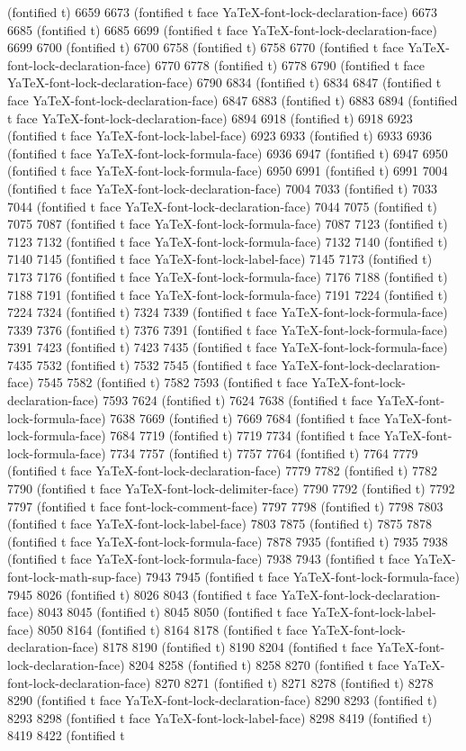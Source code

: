 (fontified t) 6659 6673 (fontified t face YaTeX-font-lock-declaration-face) 6673 6685 (fontified t) 6685 6699 (fontified t face YaTeX-font-lock-declaration-face) 6699 6700 (fontified t) 6700 6758 (fontified t) 6758 6770 (fontified t face YaTeX-font-lock-declaration-face) 6770 6778 (fontified t) 6778 6790 (fontified t face YaTeX-font-lock-declaration-face) 6790 6834 (fontified t) 6834 6847 (fontified t face YaTeX-font-lock-declaration-face) 6847 6883 (fontified t) 6883 6894 (fontified t face YaTeX-font-lock-declaration-face) 6894 6918 (fontified t) 6918 6923 (fontified t face YaTeX-font-lock-label-face) 6923 6933 (fontified t) 6933 6936 (fontified t face YaTeX-font-lock-formula-face) 6936 6947 (fontified t) 6947 6950 (fontified t face YaTeX-font-lock-formula-face) 6950 6991 (fontified t) 6991 7004 (fontified t face YaTeX-font-lock-declaration-face) 7004 7033 (fontified t) 7033 7044 (fontified t face YaTeX-font-lock-declaration-face) 7044 7075 (fontified t) 7075 7087 (fontified t face YaTeX-font-lock-formula-face) 7087 7123 (fontified t) 7123 7132 (fontified t face YaTeX-font-lock-formula-face) 7132 7140 (fontified t) 7140 7145 (fontified t face YaTeX-font-lock-label-face) 7145 7173 (fontified t) 7173 7176 (fontified t face YaTeX-font-lock-formula-face) 7176 7188 (fontified t) 7188 7191 (fontified t face YaTeX-font-lock-formula-face) 7191 7224 (fontified t) 7224 7324 (fontified t) 7324 7339 (fontified t face YaTeX-font-lock-formula-face) 7339 7376 (fontified t) 7376 7391 (fontified t face YaTeX-font-lock-formula-face) 7391 7423 (fontified t) 7423 7435 (fontified t face YaTeX-font-lock-formula-face) 7435 7532 (fontified t) 7532 7545 (fontified t face YaTeX-font-lock-declaration-face) 7545 7582 (fontified t) 7582 7593 (fontified t face YaTeX-font-lock-declaration-face) 7593 7624 (fontified t) 7624 7638 (fontified t face YaTeX-font-lock-formula-face) 7638 7669 (fontified t) 7669 7684 (fontified t face YaTeX-font-lock-formula-face) 7684 7719 (fontified t) 7719 7734 (fontified t face YaTeX-font-lock-formula-face) 7734 7757 (fontified t) 7757 7764 (fontified t) 7764 7779 (fontified t face YaTeX-font-lock-declaration-face) 7779 7782 (fontified t) 7782 7790 (fontified t face YaTeX-font-lock-delimiter-face) 7790 7792 (fontified t) 7792 7797 (fontified t face font-lock-comment-face) 7797 7798 (fontified t) 7798 7803 (fontified t face YaTeX-font-lock-label-face) 7803 7875 (fontified t) 7875 7878 (fontified t face YaTeX-font-lock-formula-face) 7878 7935 (fontified t) 7935 7938 (fontified t face YaTeX-font-lock-formula-face) 7938 7943 (fontified t face YaTeX-font-lock-math-sup-face) 7943 7945 (fontified t face YaTeX-font-lock-formula-face) 7945 8026 (fontified t) 8026 8043 (fontified t face YaTeX-font-lock-declaration-face) 8043 8045 (fontified t) 8045 8050 (fontified t face YaTeX-font-lock-label-face) 8050 8164 (fontified t) 8164 8178 (fontified t face YaTeX-font-lock-declaration-face) 8178 8190 (fontified t) 8190 8204 (fontified t face YaTeX-font-lock-declaration-face) 8204 8258 (fontified t) 8258 8270 (fontified t face YaTeX-font-lock-declaration-face) 8270 8271 (fontified t) 8271 8278 (fontified t) 8278 8290 (fontified t face YaTeX-font-lock-declaration-face) 8290 8293 (fontified t) 8293 8298 (fontified t face YaTeX-font-lock-label-face) 8298 8419 (fontified t) 8419 8422 (fontified t 